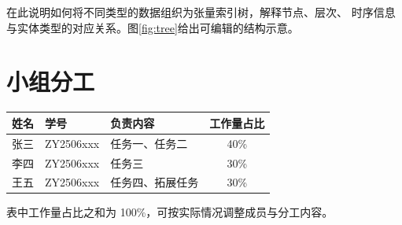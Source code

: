\documentclass[sigconf,nonacm,screen]{acmart}
\begin{document}
在此说明如何将不同类型的数据组织为张量索引树，解释节点、层次、
时序信息与实体类型的对应关系。图\ref{fig:tree}给出可编辑的结构示意。





\appendix
\section{小组分工}
\label{app:division}
\begin{center}
\label{tab:division}
\setlength{\tabcolsep}{3.5pt}
\begin{tabular}{llp{3.4cm}c}
  \toprule
  姓名 & 学号 & 负责内容 & 工作量占比\\
  \midrule
  张三 & ZY2506xxx & 任务一、任务二 & 40\%\\
  李四 & ZY2506xxx & 任务三 & 30\%\\
  王五 & ZY2506xxx & 任务四、拓展任务 & 30\%\\
  \bottomrule
\end{tabular}
\end{center}

表中工作量占比之和为 100\%，可按实际情况调整成员与分工内容。
\end{document}
